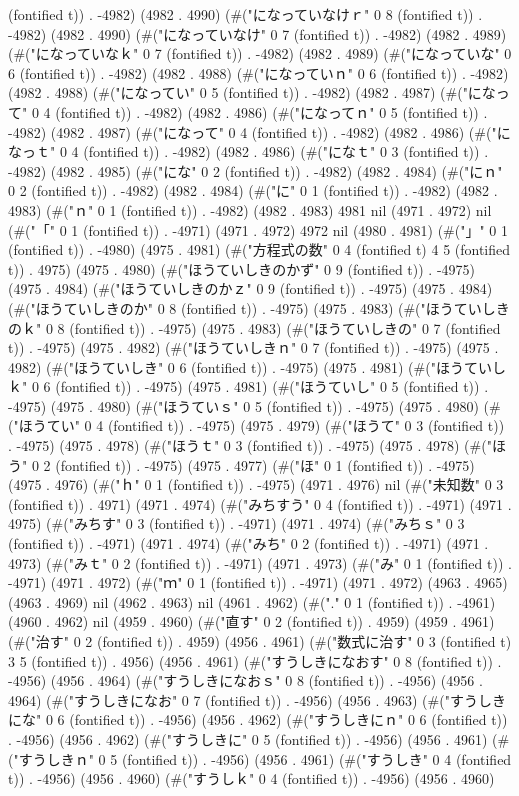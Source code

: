 (fontified t)) . -4982) (4982 . 4990) (#("になっていなけｒ" 0 8 (fontified t)) . -4982) (4982 . 4990) (#("になっていなけ" 0 7 (fontified t)) . -4982) (4982 . 4989) (#("になっていなｋ" 0 7 (fontified t)) . -4982) (4982 . 4989) (#("になっていな" 0 6 (fontified t)) . -4982) (4982 . 4988) (#("になっていｎ" 0 6 (fontified t)) . -4982) (4982 . 4988) (#("になってい" 0 5 (fontified t)) . -4982) (4982 . 4987) (#("になって" 0 4 (fontified t)) . -4982) (4982 . 4986) (#("になってｎ" 0 5 (fontified t)) . -4982) (4982 . 4987) (#("になって" 0 4 (fontified t)) . -4982) (4982 . 4986) (#("になっｔ" 0 4 (fontified t)) . -4982) (4982 . 4986) (#("になｔ" 0 3 (fontified t)) . -4982) (4982 . 4985) (#("にな" 0 2 (fontified t)) . -4982) (4982 . 4984) (#("にｎ" 0 2 (fontified t)) . -4982) (4982 . 4984) (#("に" 0 1 (fontified t)) . -4982) (4982 . 4983) (#("ｎ" 0 1 (fontified t)) . -4982) (4982 . 4983) 4981 nil (4971 . 4972) nil (#("「" 0 1 (fontified t)) . -4971) (4971 . 4972) 4972 nil (4980 . 4981) (#("」" 0 1 (fontified t)) . -4980) (4975 . 4981) (#("方程式の数" 0 4 (fontified t) 4 5 (fontified t)) . 4975) (4975 . 4980) (#("ほうていしきのかず" 0 9 (fontified t)) . -4975) (4975 . 4984) (#("ほうていしきのかｚ" 0 9 (fontified t)) . -4975) (4975 . 4984) (#("ほうていしきのか" 0 8 (fontified t)) . -4975) (4975 . 4983) (#("ほうていしきのｋ" 0 8 (fontified t)) . -4975) (4975 . 4983) (#("ほうていしきの" 0 7 (fontified t)) . -4975) (4975 . 4982) (#("ほうていしきｎ" 0 7 (fontified t)) . -4975) (4975 . 4982) (#("ほうていしき" 0 6 (fontified t)) . -4975) (4975 . 4981) (#("ほうていしｋ" 0 6 (fontified t)) . -4975) (4975 . 4981) (#("ほうていし" 0 5 (fontified t)) . -4975) (4975 . 4980) (#("ほうていｓ" 0 5 (fontified t)) . -4975) (4975 . 4980) (#("ほうてい" 0 4 (fontified t)) . -4975) (4975 . 4979) (#("ほうて" 0 3 (fontified t)) . -4975) (4975 . 4978) (#("ほうｔ" 0 3 (fontified t)) . -4975) (4975 . 4978) (#("ほう" 0 2 (fontified t)) . -4975) (4975 . 4977) (#("ほ" 0 1 (fontified t)) . -4975) (4975 . 4976) (#("ｈ" 0 1 (fontified t)) . -4975) (4971 . 4976) nil (#("未知数" 0 3 (fontified t)) . 4971) (4971 . 4974) (#("みちすう" 0 4 (fontified t)) . -4971) (4971 . 4975) (#("みちす" 0 3 (fontified t)) . -4971) (4971 . 4974) (#("みちｓ" 0 3 (fontified t)) . -4971) (4971 . 4974) (#("みち" 0 2 (fontified t)) . -4971) (4971 . 4973) (#("みｔ" 0 2 (fontified t)) . -4971) (4971 . 4973) (#("み" 0 1 (fontified t)) . -4971) (4971 . 4972) (#("ｍ" 0 1 (fontified t)) . -4971) (4971 . 4972) (4963 . 4965) (4963 . 4969) nil (4962 . 4963) nil (4961 . 4962) (#("." 0 1 (fontified t)) . -4961) (4960 . 4962) nil (4959 . 4960) (#("直す" 0 2 (fontified t)) . 4959) (4959 . 4961) (#("治す" 0 2 (fontified t)) . 4959) (4956 . 4961) (#("数式に治す" 0 3 (fontified t) 3 5 (fontified t)) . 4956) (4956 . 4961) (#("すうしきになおす" 0 8 (fontified t)) . -4956) (4956 . 4964) (#("すうしきになおｓ" 0 8 (fontified t)) . -4956) (4956 . 4964) (#("すうしきになお" 0 7 (fontified t)) . -4956) (4956 . 4963) (#("すうしきにな" 0 6 (fontified t)) . -4956) (4956 . 4962) (#("すうしきにｎ" 0 6 (fontified t)) . -4956) (4956 . 4962) (#("すうしきに" 0 5 (fontified t)) . -4956) (4956 . 4961) (#("すうしきｎ" 0 5 (fontified t)) . -4956) (4956 . 4961) (#("すうしき" 0 4 (fontified t)) . -4956) (4956 . 4960) (#("すうしｋ" 0 4 (fontified t)) . -4956) (4956 . 4960) 